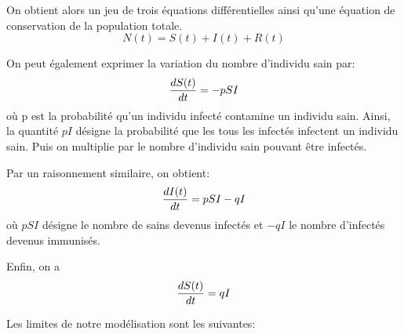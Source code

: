 \documentclass[12pt,a4paper]{report}
\begin{document}
\begin{flushleft}
	On obtient alors un jeu de trois équations différentielles ainsi qu'une équation de conservation de la population totale.
	\begin{equation} N(t)=S(t)+I(t)+R(t) \end{equation}

	On peut également exprimer la variation du nombre d'individu sain par: 
	\begin{equation} {dS(t) \over dt} = -p S I \end{equation}
où p est la probabilité qu'un individu infecté contamine un individu sain.
Ainsi, la quantité $ pI $ désigne la probabilité que les tous les infectés infectent un individu sain. Puis on multiplie par le nombre d'individu sain pouvant être infectés.

Par un raisonnement similaire, on obtient:
	\begin{equation} {dI(t) \over dt } = pSI - qI \end{equation}
	où $pSI$ désigne le nombre de sains devenus infectés et $-qI$ le nombre d'infectés devenus immunisés.


	Enfin, on a \begin{equation} {dS(t) \over dt } = qI \end{equation}

\end{flushleft}

\begin{flushleft}
Les limites de notre modélisation sont les suivantes:
\end{flushleft}

\end{document}
